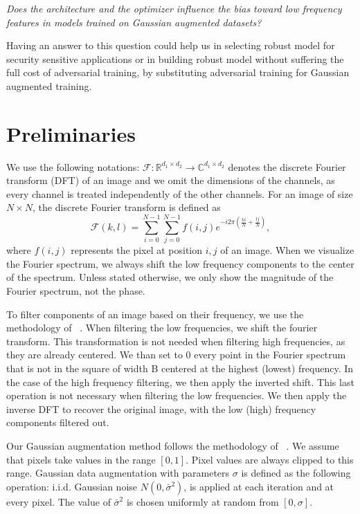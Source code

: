 \documentclass{article} \author{Simon Théorêt}
\begin{document}
\textit{Does the architecture and the optimizer influence the bias
  toward low frequency features in models trained on Gaussian
  augmented datasets?}

Having an answer to this question could help us in selecting robust
model for security sensitive applications or in building robust model
without suffering the full cost of adversarial training, by
substituting adversarial training for Gaussian augmented training.
\section{Preliminaries}
We use the following notations:
$\mathcal{F}: \mathbb{R}^{d_{1} \times d_{2}} \to
\mathbb{C}^{d_{1}\times d_{2}}$ denotes the discrete Fourier transform
(DFT) of an image and we omit the dimensions of the channels, as every
channel is treated independently of the other channels. For an image
of size $N \times N$, the discrete Fourier transform is defined as
\begin{equation}
  \mathcal{F}(k,l) =  \sum_{i=0}^{N-1} \sum_{j=0}^{N-1}f(i,j)e^{-i2\pi(\frac{ki}{N}+\frac{lj}{N})},
\end{equation}
where $f(i,j)$ represents the pixel at position $i,j$ of an
image. When we visualize the Fourier spectrum, we always shift the low
frequency components to the center of the spectrum. Unless stated
otherwise, we only show the magnitude of the Fourier spectrum, not the
phase.

To filter components of an image based on their frequency, we use the
methodology of ~\citep{yin2020fourier}. When filtering the low
frequencies, we shift the fourier transform. This transformation is
not needed when filtering high frequencies, as they are already
centered. We than set to 0 every point in the Fourier spectrum that is
not in the square of width B centered at the highest (lowest)
frequency. In the case of the high frequency filtering, we then apply
the inverted shift. This last operation is not necessary when
filtering the low frequencies. We then apply the inverse DFT to
recover the original image, with the low (high) frequency components
filtered out.

Our Gaussian augmentation method follows the methodology of
~\citep{yin2020fourier}. We assume that pixels take values in the
range $[0, 1]$. Pixel values are always clipped to this
range. Gaussian data augmentation with parameters $\sigma$ is defined
as the following operation: i.i.d. Gaussian noise
$N(0, \bar{\sigma}^{2})$, is applied at each iteration and at every
pixel. The value of $\bar{\sigma}^{2}$ is chosen uniformly at random
from $[0, \sigma]$.
\end{document}
